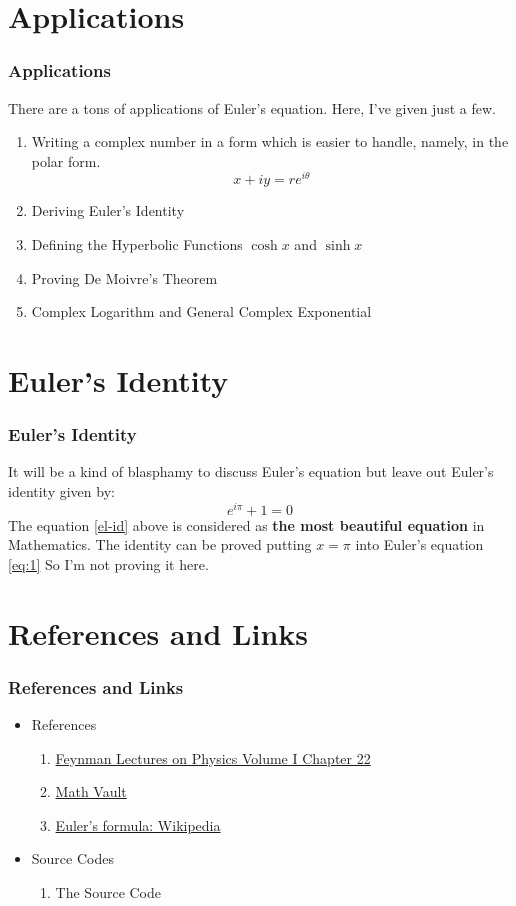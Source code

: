 \documentclass{beamer}
\begin{document}
\section{Applications}
\begin{frame}
    \frametitle{Applications}
    There are a tons of applications of Euler's equation. Here, I've given just a few.
    \begin{enumerate}
        \item Writing a complex number in a form which is easier to handle, namely, in the polar form. $$x+iy = re^{i\theta}$$
        \item Deriving Euler's Identity
        \item Defining the Hyperbolic Functions $\cosh{x}$ and $\sinh{x}$ 
        \item Proving De Moivre’s Theorem 
        \item Complex Logarithm and General Complex Exponential
    \end{enumerate}
\end{frame}

\section{Euler's Identity}
\begin{frame}
    \frametitle{Euler's Identity}
    It will be a kind of blasphamy to discuss Euler's equation but leave out Euler's identity given by:
    \begin{equation}
        \label{el-id}
        e^{i\pi} + 1 = 0
    \end{equation}
The equation \ref{el-id} above is considered as \textbf{the most beautiful equation} in Mathematics. The identity can be proved putting $x=\pi$ into Euler's equation \ref{eq:1} So I'm not proving it here.
\end{frame}

\section{References and Links}
\begin{frame}
    \frametitle{References and Links}
    \begin{itemize}
        \item References \begin{enumerate}
            \item \href{https://www.feynmanlectures.caltech.edu/I_22.html}{Feynman Lectures on Physics Volume I Chapter 22}
            \item \href{https://mathvault.ca/euler-formula/}{Math Vault}
            \item \href{https://en.wikipedia.org/wiki/Eulers_formula}{Euler's formula: Wikipedia}
        \end{enumerate}
        \item Source Codes \begin{enumerate}
            \item The Source Code
        \end{enumerate}
    \end{itemize}
\end{frame}
\end{document}
